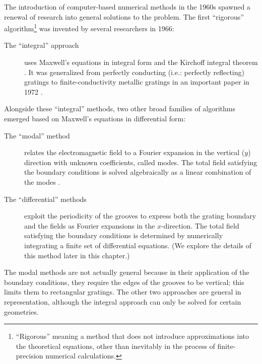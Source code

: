 The introduction of computer-based numerical methods in the 1960s spawned a renewal of research into general solutions to the problem.  The first ``rigorous'' algorithm\footnote{``Rigorous'' meaning a method that does not introduce approximations into the theoretical equations, other than inevitably in the process of finite-precision numerical calculations.} was invented by several researchers in 1966:
\begin{description}
\item[The ``integral'' approach] uses Maxwell's equations in integral form and the Kirchoff integral theorem \cite{Pet66}\cite{Wir69}\cite{Pav70}.  It was generalized from perfectly conducting (i.e.: perfectly reflecting) gratings to finite-conductivity metallic gratings in an important paper in 1972 \cite{May72}.
\end{description}
Alongside these ``integral'' methods, two other broad families of algorithms emerged based on Maxwell's equations in differential form:
\begin{description}
\item[The ``modal'' method] relates the electromagnetic field to a Fourier expansion in the vertical ($y$) direction with unknown coefficients, called modes. The total field satisfying the boundary conditions is solved algebraically as a linear combination of the modes \cite{Bot81}\cite{Bot81a}\cite{And81}.
\item[The ``differential'' methods] exploit the periodicity of the grooves to express both the grating boundary and the fields as Fourier expansions in the $x$-direction. The total field satisfying the boundary conditions is determined by numerically integrating a finite set of differential equations. (We explore the details of this method later in this chapter.)
\end{description}
The modal methods are not actually general because in their application of the boundary conditions, they require the edges of the grooves to be vertical; this limits them to rectangular gratings.
The other two approaches are general in representation, although the integral approach can only be solved for certain geometries.

